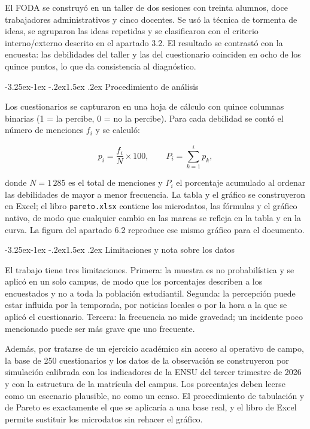 \documentclass[11pt,a4paper]{article}
\makeatletter
\renewcommand\subsection{\@startsection{subsection}{2}{\z@}%
  {-3.25ex\@plus -1ex \@minus -.2ex}{1.5ex \@plus .2ex}%
  {\normalfont\large\bfseries\color{uazblue!85!black}}}
\makeatother
\begin{document}
El FODA se construyó en un taller de dos sesiones con treinta alumnos, doce
trabajadores administrativos y cinco docentes. Se usó la técnica de tormenta de
ideas, se agruparon las ideas repetidas y se clasificaron con el criterio
interno/externo descrito en el apartado 3.2. El resultado se contrastó con la
encuesta: las debilidades del taller y las del cuestionario coinciden en ocho
de los quince puntos, lo que da consistencia al diagnóstico.

\subsection{Procedimiento de análisis}

Los cuestionarios se capturaron en una hoja de cálculo con quince columnas
binarias (1 = la percibe, 0 = no la percibe). Para cada debilidad se contó el
número de menciones $f_i$ y se calculó:

\begin{equation}
  p_i = \frac{f_i}{N}\times 100,
  \qquad
  P_i = \sum_{k=1}^{i} p_k,
\end{equation}

donde $N=1\,285$ es el total de menciones y $P_i$ el porcentaje acumulado al
ordenar las debilidades de mayor a menor frecuencia. La tabla y el gráfico se
construyeron en Excel; el libro \texttt{pareto.xlsx} contiene los microdatos,
las fórmulas y el gráfico nativo, de modo que cualquier cambio en las marcas se
refleja en la tabla y en la curva. La figura del apartado 6.2 reproduce ese
mismo gráfico para el documento.

\subsection{Limitaciones y nota sobre los datos}

El trabajo tiene tres limitaciones. Primera: la muestra es no probabilística y
se aplicó en un solo campus, de modo que los porcentajes describen a los
encuestados y no a toda la población estudiantil. Segunda: la percepción puede
estar influida por la temporada, por noticias locales o por la hora a la que se
aplicó el cuestionario. Tercera: la frecuencia no mide gravedad; un incidente
poco mencionado puede ser más grave que uno frecuente.

Además, por tratarse de un ejercicio académico sin acceso al operativo de
campo, la base de 250 cuestionarios y los datos de la observación se
construyeron por simulación calibrada con los indicadores de la ENSU del tercer
trimestre de 2026 y con la estructura de la matrícula del campus. Los porcentajes deben leerse como un escenario
plausible, no como un censo. El procedimiento de tabulación y de Pareto es
exactamente el que se aplicaría a una base real, y el libro de Excel permite
sustituir los microdatos sin rehacer el gráfico.
\end{document}
